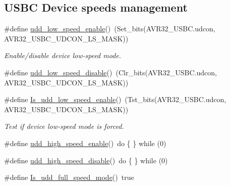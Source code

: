 \subsection*{\-U\-S\-B\-C \-Device speeds management}
\begin{DoxyCompactItemize}
\item 
\#define \hyperlink{group__udd__group_gaf272a0d4210ee260d0a267bba460fb0c}{udd\-\_\-low\-\_\-speed\-\_\-enable}()~(\-Set\-\_\-bits(\-A\-V\-R32\-\_\-\-U\-S\-B\-C.\-udcon, \-A\-V\-R32\-\_\-\-U\-S\-B\-C\-\_\-\-U\-D\-C\-O\-N\-\_\-\-L\-S\-\_\-\-M\-A\-S\-K))
\begin{DoxyCompactList}\small\item\em \-Enable/disable device low-\/speed mode. \end{DoxyCompactList}\item 
\#define \hyperlink{group__udd__group_ga6471bbaea371bb9bb2654333236c9f29}{udd\-\_\-low\-\_\-speed\-\_\-disable}()~(\-Clr\-\_\-bits(\-A\-V\-R32\-\_\-\-U\-S\-B\-C.\-udcon, \-A\-V\-R32\-\_\-\-U\-S\-B\-C\-\_\-\-U\-D\-C\-O\-N\-\_\-\-L\-S\-\_\-\-M\-A\-S\-K))
\item 
\#define \hyperlink{group__udd__group_gaedea021600d07a71a1672b393c550c39}{\-Is\-\_\-udd\-\_\-low\-\_\-speed\-\_\-enable}()~(\-Tst\-\_\-bits(\-A\-V\-R32\-\_\-\-U\-S\-B\-C.\-udcon, \-A\-V\-R32\-\_\-\-U\-S\-B\-C\-\_\-\-U\-D\-C\-O\-N\-\_\-\-L\-S\-\_\-\-M\-A\-S\-K))
\begin{DoxyCompactList}\small\item\em \-Test if device low-\/speed mode is forced. \end{DoxyCompactList}\item 
\#define \hyperlink{group__udd__group_gae014bb3adcdf212fd61196307be88802}{udd\-\_\-high\-\_\-speed\-\_\-enable}()~do \{ \} while (0)
\item 
\#define \hyperlink{group__udd__group_ga7adf42a2ec72e7f2429a9b02799333af}{udd\-\_\-high\-\_\-speed\-\_\-disable}()~do \{ \} while (0)
\item 
\#define \hyperlink{group__udd__group_ga977c78f164f32fa910802518aab7b0ed}{\-Is\-\_\-udd\-\_\-full\-\_\-speed\-\_\-mode}()~true
\end{DoxyCompactItemize}
